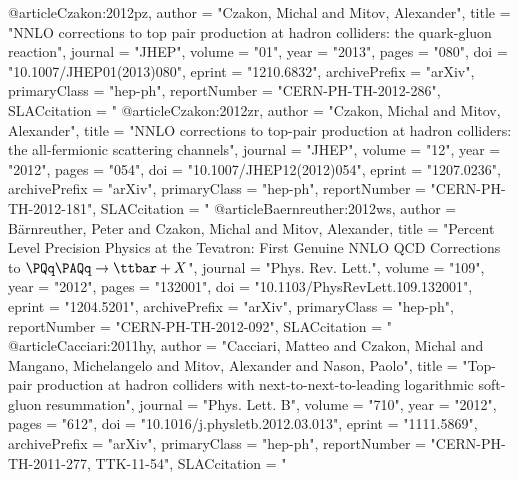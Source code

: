 @article{Czakon:2012pz,
      author         = "Czakon, Michal and Mitov, Alexander",
      title          = "{NNLO corrections to top pair production at hadron
                        colliders: the quark-gluon reaction}",
      journal        = "JHEP",
      volume         = "01",
      year           = "2013",
      pages          = "080",
      doi            = "10.1007/JHEP01(2013)080",
      eprint         = "1210.6832",
      archivePrefix  = "arXiv",
      primaryClass   = "hep-ph",
      reportNumber   = "CERN-PH-TH-2012-286",
      SLACcitation   = "%
}
@article{Czakon:2012zr,
      author         = "Czakon, Michal and Mitov, Alexander",
      title          = "{NNLO corrections to top-pair production at hadron
                        colliders: the all-fermionic scattering channels}",
      journal        = "JHEP",
      volume         = "12",
      year           = "2012",
      pages          = "054",
      doi            = "10.1007/JHEP12(2012)054",
      eprint         = "1207.0236",
      archivePrefix  = "arXiv",
      primaryClass   = "hep-ph",
      reportNumber   = "CERN-PH-TH-2012-181",
      SLACcitation   = "%
}
@article{Baernreuther:2012ws,
      author         = {B{\"{a}}rnreuther, Peter and Czakon, Michal and Mitov,
                        Alexander},
      title          = "{Percent Level Precision Physics at the Tevatron: First
                        Genuine NNLO QCD Corrections to $\PQq\PAQq\to\ttbar +
                        X$}",
      journal        = "Phys. Rev. Lett.",
      volume         = "109",
      year           = "2012",
      pages          = "132001",
      doi            = "10.1103/PhysRevLett.109.132001",
      eprint         = "1204.5201",
      archivePrefix  = "arXiv",
      primaryClass   = "hep-ph",
      reportNumber   = "CERN-PH-TH-2012-092",
      SLACcitation   = "%
}
@article{Cacciari:2011hy,
      author         = "Cacciari, Matteo and Czakon, Michal and Mangano,
                        Michelangelo and Mitov, Alexander and Nason, Paolo",
      title          = "{Top-pair production at hadron colliders with
                        next-to-next-to-leading logarithmic soft-gluon
                        resummation}",
      journal        = "Phys. Lett. B",
      volume         = "710",
      year           = "2012",
      pages          = "612",
      doi            = "10.1016/j.physletb.2012.03.013",
      eprint         = "1111.5869",
      archivePrefix  = "arXiv",
      primaryClass   = "hep-ph",
      reportNumber   = "CERN-PH-TH-2011-277, TTK-11-54",
      SLACcitation   = "%
}

